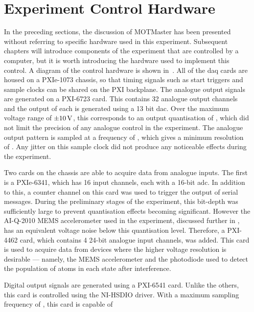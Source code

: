 \section{Experiment Control Hardware}\label{sec:mm_control_hardware}
In the preceding sections, the discussion of MOTMaster has been presented
without referring to specific hardware used in this experiment. Subsequent
chapters will introduce components of the experiment that are controlled by a
computer, but it is worth introducing the hardware used to implement this
control. A diagram of the control hardware is shown in~. All of the \ac{daq} cards are housed on a PXIe-1073 chassis, so that
timing signals such as start triggers and sample clocks can be shared on the
PXI backplane. The analogue output signals are generated on a
PXI-6723 card. This contains 32 analogue output channels and the output of
each is generated using a 13 bit \ac{dac}. Over the maximum voltage range of
\(\pm \sivalue{10}{\volt}\), this corresponds to an output quantisation of
, which did not limit the precision of any
analogue control in the experiment. The analogue output pattern is sampled at
a frequency of , which gives a minimum resolution
of . Any jitter on this sample clock did not
produce any noticeable effects during the experiment. \par\noindent
Two cards on the chassis are able to acquire data from analogue inputs. The
first is a PXIe-6341, which has 16 input channels, each with a 16-bit
\ac{adc}. In addition to this, a counter channel on this card was used to trigger the output of serial messages. During the preliminary stages of the experiment, this bit-depth was
sufficiently large to prevent quantisation effects becoming significant. However
the AI-Q-2010 MEMS accelerometer used in the experiment, discussed further in , has an equivalent voltage noise below this quantisation level. Therefore, a
PXI-4462 card, which contains 4 24-bit analogue input channels, was added.
This card is used to acquire data from devices where the higher voltage
resolution is desirable --- namely, the MEMS accelerometer and the
photodiode used to detect the population of atoms in each state after interference.\par\noindent
Digital output signals are generated using a PXI-6541 card. Unlike the
others, this card is controlled using the NI-HSDIO driver. With a maximum
sampling frequency of , this card is capable of
